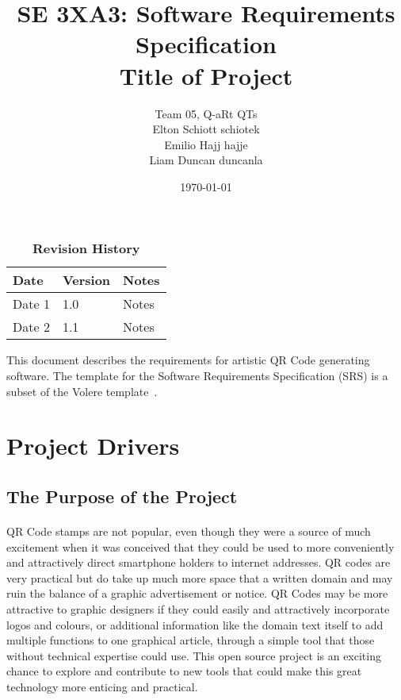 \documentclass[12pt, titlepage]{article}
\title{SE 3XA3: Software Requirements Specification\\Title of Project}
\author{Team 05, Q-aRt QTs
		\\ Elton Schiott schiotek
		\\ Emilio Hajj hajje
		\\ Liam Duncan duncanla
}
\date{\today}
\begin{document}
\maketitle

\tableofcontents
\listoftables
\listoffigures

\begin{table}[bp]
\caption{\bf Revision History}
\begin{tabularx}{\textwidth}{p{3cm}p{2cm}X}
\toprule {\bf Date} & {\bf Version} & {\bf Notes}\\
\midrule
Date 1 & 1.0 & Notes\\
Date 2 & 1.1 & Notes\\
\bottomrule
\end{tabularx}
\end{table}

\newpage


This document describes the requirements for artistic QR Code generating 
software.  The template for the Software
Requirements Specification (SRS) is a subset of the Volere
template~\citep{RobertsonAndRobertson2012}.  

\section{Project Drivers}

\subsection{The Purpose of the Project}

	\paragraph{}
		
		QR Code stamps are not popular, even though they were a source of much 
		excitement when it was conceived that they could be used to more 
		conveniently and attractively direct smartphone holders to internet 
		addresses. QR codes are very practical but do take up much more space 
		that a written domain and may ruin the balance of a graphic 
		advertisement or notice. QR Codes may be more attractive to graphic 
		designers if they could easily and attractively incorporate logos and 
		colours, or additional information like the domain text itself to add 
		multiple functions to one graphical article, through a simple tool that 
		those without technical expertise could use. This open source project 
		is an exciting chance to explore and contribute to new tools that could 
		make this great technology more enticing and practical.
\end{document}
